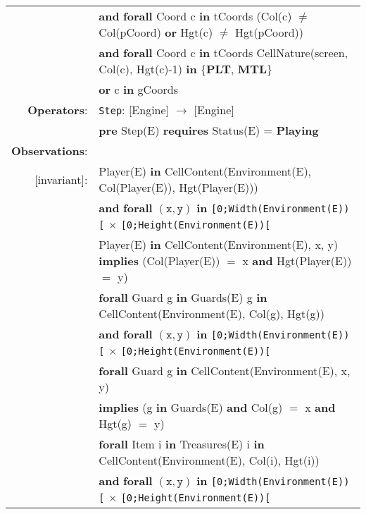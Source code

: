 \documentclass[8pt]{article}
\begin{document}
{\begin{longtable}{rl}
  & \quad\quad\quad \textbf{and} \textbf{forall} \textrm{Coord} c \textbf{in} tCoords (\textrm{Col(c)} $\neq$ \textrm{Col(pCoord)} \textbf{or} \textrm{Hgt(c)} $\neq$ \textrm{Hgt(pCoord)})\\
  & \quad\quad\quad \textbf{and} \textbf{forall} \textrm{Coord} c \textbf{in} tCoords \textrm{CellNature(screen, Col(c), Hgt(c)-1)} \textbf{in} \{\textbf{PLT}, \textbf{MTL}\} \\
  & \quad\quad\quad\quad\quad \textbf{or} c \textbf{in} gCoords \\
  \textbf{Operators}: &\texttt{Step}: \textrm{[Engine]} $\rightarrow$ \textrm{[Engine]} \\
  & \quad \textbf{pre} \textrm{Step(E)} \textbf{requires} \textrm{Status(E)} = \textbf{Playing}\\
  \textbf{Observations}:&\\
  \textrm{[invariant]}:& \textrm{Player(E)} \textbf{in} \textrm{CellContent(Environment(E), Col(Player(E)), Hgt(Player(E)))}\\
  & \quad\quad \textbf{and} \textbf{forall} $(\mathtt{x},\mathtt{y})$ \textbf{in} \texttt{[0;Width(Environment(E))[} $\times$ \texttt{[0;Height(Environment(E))[}\\
  & \quad\quad\quad\quad \textrm{Player(E)} \textbf{in} \textrm{CellContent(Environment(E), x, y)} \textbf{implies} (\textrm{Col(Player(E))} $=$ x \textbf{and} \textrm{Hgt(Player(E))} $=$ y)\\
  & \textbf{forall} \textrm{Guard} g \textbf{in} \textrm{Guards(E)} g \textbf{in} \textrm{CellContent(Environment(E), Col(g), Hgt(g))}\\
  & \quad\quad \textbf{and} \textbf{forall} $(\mathtt{x},\mathtt{y})$ \textbf{in} \texttt{[0;Width(Environment(E))[} $\times$ \texttt{[0;Height(Environment(E))[}\\
  & \quad\quad\quad\quad \textbf{forall} \textrm{Guard} g \textbf{in} \textrm{CellContent(Environment(E), x, y)} \\
  & \quad\quad\quad\quad\quad\quad \textbf{implies} (g \textbf{in} \textrm{Guards(E)} \textbf{and} \textrm{Col(g)} $=$ x \textbf{and} \textrm{Hgt(g)} $=$ y)\\
  & \textbf{forall} \textrm{Item} i \textbf{in} \textrm{Treasures(E)} i \textbf{in} \textrm{CellContent(Environment(E), Col(i), Hgt(i))}\\
  & \quad\quad \textbf{and} \textbf{forall} $(\mathtt{x},\mathtt{y})$ \textbf{in} \texttt{[0;Width(Environment(E))[} $\times$ \texttt{[0;Height(Environment(E))[}\\

\end{longtable}}
\end{document}
